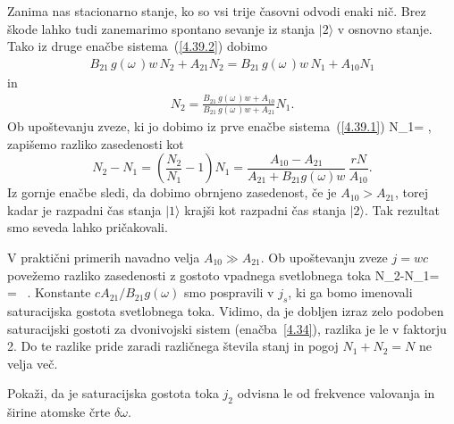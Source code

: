 Zanima nas stacionarno stanje, ko so vsi trije časovni odvodi enaki nič. 
Brez škode lahko tudi zanemarimo spontano sevanje iz stanja
$|2\rangle$ v osnovno stanje. Tako iz druge enačbe sistema~(\ref{4.39.2}) 
dobimo
\begin{eqnarray}
B_{21}\,g(\omega\,)w\, N_{2}+A_{21}N_{2} = B_{21}\,g(\omega\,)w\, N_{1} + A_{10}N_{1} 
\end{eqnarray}
in
\begin{eqnarray}
N_2 = \frac{B_{21}\,g(\omega\,)w + A_{10}}{B_{21}\,g(\omega\,)w+A_{21}}N_1.  
\end{eqnarray}
Ob upoštevanju zveze, ki jo dobimo iz prve enačbe sistema~(\ref{4.39.1})
\beq
N_1= , 
\eeq
zapišemo razliko zasedenosti kot 
\begin{equation}
N_{2}-N_{1}=\left(\frac{N_2}{N_1}-1\right)N_1=\frac{A_{10}-A_{21}}{A_{21}+
B_{21}g(\omega)w} \,\frac{rN}{A_{10}}.
\label{4.42}
\end{equation}
Iz gornje enačbe sledi, da dobimo obrnjeno zasedenost, če je $A_{10}>A_{21}$, torej kadar je
razpadni čas stanja $|1\rangle$ krajši kot razpadni čas stanja $|2\rangle$.
Tak rezultat smo seveda lahko pričakovali.

V praktični primerih navadno velja $A_{10}\gg A_{21}$. Ob upoštevanju zveze $j=wc$ povežemo
razliko zasedenosti z gostoto vpadnega svetlobnega toka
\beq
N_{2}-N_{1}= \,  = 
 \, .
\label{eq:3n_N}
\eeq
Konstante $c A_{21}/B_{21}g(\omega)$ smo pospravili v $j_s$, ki ga bomo imenovali 
saturacijska gostota svetlobnega toka. Vidimo, da je dobljen
izraz zelo podoben saturacijski gostoti za dvonivojski sistem (enačba~\ref{4.34}), razlika je le
v faktorju 2. Do te razlike pride zaradi različnega števila stanj in pogoj $N_{1}+N_{2}=N$
ne velja več. 

\begin{definition}
 Pokaži, da je saturacijska gostota toka $j_2$ odvisna le od frekvence valovanja in širine 
 atomske črte $\delta \omega$. 
\end{definition}

